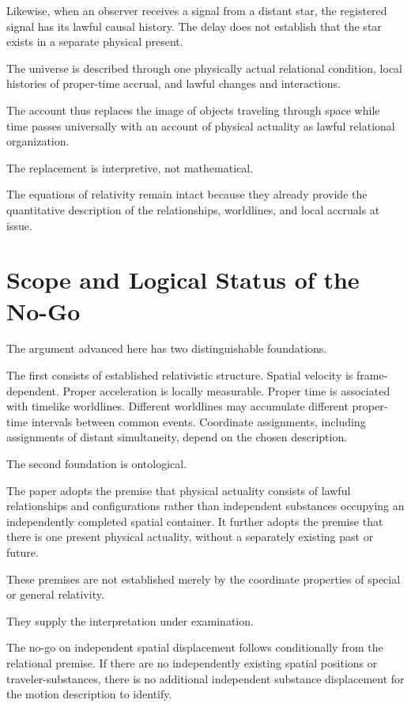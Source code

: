 \documentclass[12pt,onecolumn]{article}
\begin{document}
Likewise, when an observer receives a signal from a distant star, the registered signal has its lawful causal history. The delay does not establish that the star exists in a separate physical present.

The universe is described through one physically actual relational condition, local histories of proper-time accrual, and lawful changes and interactions.

The account thus replaces the image of objects traveling through space while time passes universally with an account of physical actuality as lawful relational organization.

The replacement is interpretive, not mathematical.

The equations of relativity remain intact because they already provide the quantitative description of the relationships, worldlines, and local accruals at issue.

\section{Scope and Logical Status of the No-Go}

The argument advanced here has two distinguishable foundations.

The first consists of established relativistic structure. Spatial velocity is frame-dependent. Proper acceleration is locally measurable. Proper time is associated with timelike worldlines. Different worldlines may accumulate different proper-time intervals between common events. Coordinate assignments, including assignments of distant simultaneity, depend on the chosen description.

The second foundation is ontological.

The paper adopts the premise that physical actuality consists of lawful relationships and configurations rather than independent substances occupying an independently completed spatial container. It further adopts the premise that there is one present physical actuality, without a separately existing past or future.

These premises are not established merely by the coordinate properties of special or general relativity.

They supply the interpretation under examination.

The no-go on independent spatial displacement follows conditionally from the relational premise. If there are no independently existing spatial positions or traveler-substances, there is no additional independent substance displacement for the motion description to identify.
\end{document}
